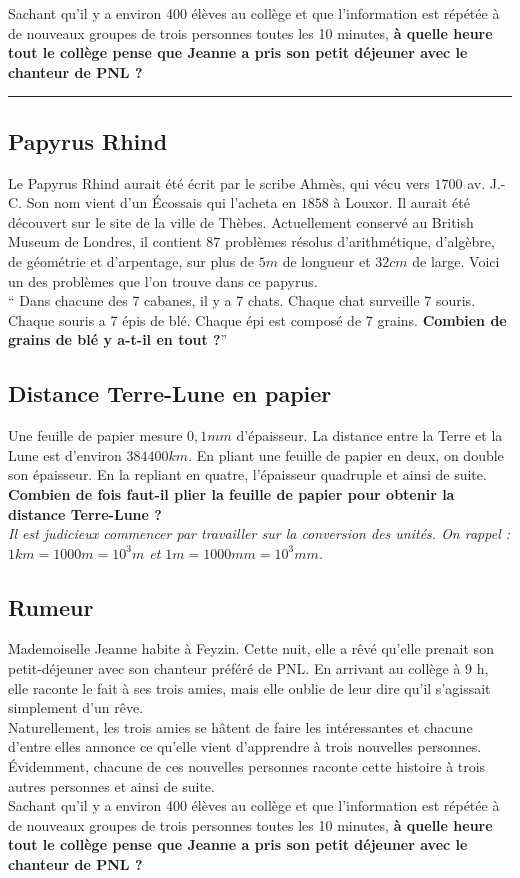 \documentclass[10t]{article}
\newcommand{\horrule}[1]{\rule{\linewidth}{#1}} %
\begin{document}
Sachant qu'il y a environ 400 élèves au collège et que l'information est répétée à de nouveaux groupes de trois personnes toutes les 10 minutes, \textbf{à quelle heure tout le collège pense que Jeanne a pris son petit déjeuner avec le chanteur de PNL ?}

\horrule{1px}

\subsection*{Papyrus Rhind}
Le Papyrus Rhind aurait été écrit par le scribe Ahmès, qui vécu vers $1700$ av. J.-C. Son nom vient d'un Écossais qui l'acheta en $1858$ à Louxor. Il aurait été découvert sur le site de la ville de Thèbes. Actuellement conservé au British Museum de Londres, il contient $87$ problèmes résolus d'arithmétique, d'algèbre, de géométrie et d'arpentage, sur plus de $5m$ de longueur et $32cm$ de large. Voici un des problèmes que l’on trouve dans ce papyrus.\\

`` Dans chacune des 7 cabanes, il y a 7 chats. Chaque chat surveille 7 souris. Chaque souris a 7 épis de blé. Chaque épi est composé de 7 grains. \textbf{Combien de grains de blé y a-t-il en tout ?}''

\subsection*{Distance Terre-Lune en papier}
Une feuille de papier mesure $0,1 mm$ d’épaisseur. La distance entre la Terre et la Lune est d’environ $384 400 km$. En pliant une feuille de papier en deux, on double son épaisseur. En la repliant en quatre, l’épaisseur quadruple et ainsi de suite.\\
\textbf{Combien de fois faut-il plier la feuille de papier pour obtenir la distance Terre-Lune ?}\\

\textit{Il est judicieux commencer par travailler sur la conversion des unités. On rappel : $1km = 1 000m = 10^3 m$ et $1m = 1 000 mm = 10^3 mm$.}

\subsection*{Rumeur}

Mademoiselle Jeanne habite à Feyzin. Cette nuit, elle a rêvé qu’elle prenait son petit-déjeuner avec son chanteur préféré de PNL. En arrivant au collège à 9 h, elle raconte le fait à ses trois amies, mais elle oublie de leur dire qu'il s'agissait simplement d'un rêve.\\

Naturellement, les trois amies se hâtent de faire les intéressantes et chacune d’entre elles annonce ce qu’elle vient d’apprendre à trois nouvelles personnes. Évidemment, chacune de ces nouvelles personnes raconte cette histoire à trois autres personnes et ainsi de suite.\\

Sachant qu'il y a environ 400 élèves au collège et que l'information est répétée à de nouveaux groupes de trois personnes toutes les 10 minutes, \textbf{à quelle heure tout le collège pense que Jeanne a pris son petit déjeuner avec le chanteur de PNL ?}
\end{document}
